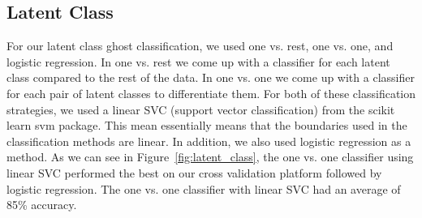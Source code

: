 \documentclass[11pt]{amsart}
\begin{document}

\subsection{Latent Class}

For our latent class ghost classification, we used one vs. rest, one vs. one, and logistic regression. In one vs. rest we come up with a classifier for each latent class compared to the rest of the data. In one vs. one we come up with a classifier for each pair of latent classes to differentiate them. For both of these classification strategies, we used a linear SVC (support vector classification) from the scikit learn svm package. This mean essentially means that the boundaries used in the classification methods are linear. In addition, we also used logistic regression as a method. As we can see in Figure~\ref{fig:latent_class}, the one vs. one classifier using linear SVC performed the best on our cross validation platform followed by logistic regression. The one vs. one classifier with linear SVC had an average of 85\% accuracy.
\end{document}
